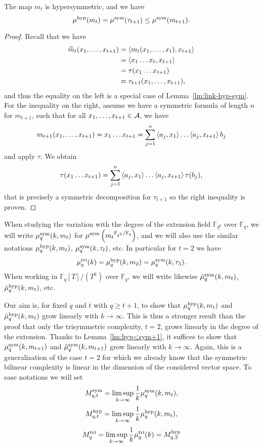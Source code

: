 \begin{lm}
\label{lm:hyp<sym+1}
The map $m_t$ is hypersymmetric, and we have
\[
\mu^{\textrm{hyp}}(m_t)=\mu^{\textrm{sym}}(\tau_{t+1})\leq\mu^{\textrm{sym}}(m_{t+1}).
\] 
\end{lm}
\begin{proof}
Recall that we have 
\begin{align*}
  \widetilde{m}_t(x_1, \dots, x_{t+1}) &= \left\langle m_t(x_1, \dots, x_t),x_{t+1}\right\rangle \\
  &= \left\langle x_1\dots x_{t},x_{t+1}\right\rangle\\
  &= \tau(x_1\dots x_{t+1})\\
  &=\tau_{t+1}(x_1, \dots, x_{t+1}),
\end{align*}
and thus the equality on the left is a special case of Lemma~\ref{lm:link-hyp-sym}.
For the inequality on the right, assume we have a symmetric formula of length
$n$ for $m_{t+1}$, such that for all $x_1, \dots, x_{t+1}\in\mathcal{A}$, we have
\[
  m_{t+1}(x_1, \dots, x_{t+1})= x_1\dots x_{t+1} = \sum_{j=1}^{n}
  \left\langle a_j,x_1\right\rangle\dots\left\langle a_j,x_{t+1}\right\rangle b_j
\]
and apply $\tau$. We obtain
\[
  \tau(x_1\dots x_{t+1})=
  \sum_{j=1}^n\left\langle a_j,x_1\right\rangle\dots\left\langle a_j,x_{t+1}\right\rangle\tau(b_j),
\]
that is precisely a symmetric decomposition for $\tau_{t+1}$ so the right
inequality is proven.
\end{proof}

When studying the variation with the degree of the extension field
$\mathbb{F}_{q^k}$ over $\mathbb{F}_q$, we will write $\mu^{\textrm{sym}}_q(k,m_t)$ for
$\mu^{\textrm{sym}}\left({m_t}^{\mathbb{F}_{q^k}/\mathbb{F}_q}\right)$, and we will also use
the similar notations $\mu^{\textrm{hyp}}_q(k,m_t)$, $\mu^{\textrm{sym}}_q(k,\tau_t)$, etc. In
particular for $t=2$ we have
\[
\mutri_q(k)=\muhyp_q(k,m_2)=\musym_q(k,\tau_3). %
\]
When working in $\mathbb{F}_q[T]/(T^k)$ over $\mathbb{F}_q$,
we will write likewise $\hat\mu^{\textrm{sym}}_q(k,m_t)$, $\hat\mu^{\textrm{hyp}}_q(k,m_t)$, etc.

Our aim is, for fixed $q$ and $t$ with $q\geq t+1$, to show that
$\mu^{\textrm{hyp}}_q(k,m_t)$ and $\hat\mu^{\textrm{hyp}}_q(k,m_t)$ grow linearly with $k\to\infty$. This
is thus a stronger result than the proof that only the trisymmetric complexity,
\ie $t=2$, grows linearly in the degree of the extension.
Thanks to Lemma~\ref{lm:hyp<sym+1}, it suffices to show that
$\mu^{\textrm{sym}}_q(k,m_{t+1})$ and $\hat\mu^{\textrm{sym}}_q(k,m_{t+1})$ grow linearly with
$k\to\infty$. Again, this is a generalization of the case $t=2$ for which we
already know that the symmetric bilinear complexity is linear in the dimension
of the considered vector space. To ease notations we will set
\[
M^{\textrm{sym}}_{q,t}=\limsup_{k\to\infty}\frac{1}{k}\mu^{\textrm{sym}}_q(k,m_t),
\]
\[
  M^{\textrm{hyp}}_{q,t}=\limsup_{k\to\infty}\frac{1}{k}\mu^{\textrm{hyp}}_q(k,m_t),
\]
\[
M^{\textrm{tri}}_q=\limsup_{k\to\infty}\frac{1}{k}\mu^{\textrm{tri}}_q(k)=M^{\textrm{hyp}}_{q,2}
\]

